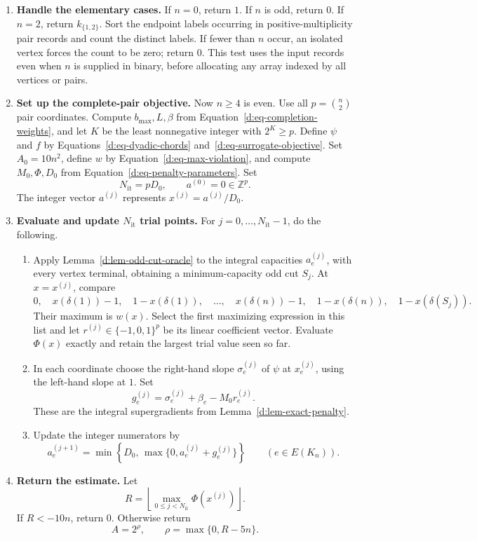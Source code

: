\begin{enumerate}[label=\textbf{\arabic*.},leftmargin=*]
\item \textbf{Handle the elementary cases.}
If \(n=0\), return \(1\).  If \(n\) is odd, return \(0\).
If \(n=2\), return \(k_{\{1,2\}}\).
Sort the endpoint labels occurring in positive-multiplicity pair records
and count the distinct labels. If fewer than \(n\) occur, an isolated
vertex forces the count to be zero; return \(0\).
This test uses the input records even when \(n\) is supplied in binary,
before allocating any array indexed by all vertices or pairs.

\item \textbf{Set up the complete-pair objective.}
Now \(n\ge4\) is even.  Use all \(p=\binom n2\) pair coordinates.
Compute \(b_{\max},L,\beta\) from Equation~\eqref{d:eq-completion-weights},
and let \(K\) be the least nonnegative integer with \(2^K\ge p\).
Define \(\psi\) and \(f\) by Equations~\eqref{d:eq-dyadic-chords}
and~\eqref{d:eq-surrogate-objective}.
Set \(A_0=10n^2\), define \(w\) by Equation~\eqref{d:eq-max-violation},
and compute \(M_0,\Phi,D_0\) from Equation~\eqref{d:eq-penalty-parameters}.
Set
\[
                 N_{\mathrm{it}}=pD_0,\qquad a^{(0)}=0\in\mathbb Z^p.
\]
The integer vector \(a^{(j)}\) represents \(x^{(j)}=a^{(j)}/D_0\).

\item \textbf{Evaluate and update \(N_{\mathrm{it}}\) trial points.}
For \(j=0,\ldots,N_{\mathrm{it}}-1\), do the following.
\begin{enumerate}[label=(\alph*),leftmargin=*]
\item Apply Lemma~\ref{d:lem-odd-cut-oracle} to the integral capacities
\(a^{(j)}_e\), with every vertex terminal, obtaining a minimum-capacity
odd cut \(S_j\).  At \(x=x^{(j)}\), compare
\[
 0,\quad x(\delta(1))-1,\quad 1-x(\delta(1)),\quad\ldots,\quad
 x(\delta(n))-1,\quad 1-x(\delta(n)),\quad 1-x(\delta(S_j)).
\]
Their maximum is \(w(x)\).  Select the first maximizing expression in
this list and let \(r^{(j)}\in\{-1,0,1\}^p\) be its linear coefficient
vector.  Evaluate \(\Phi(x)\) exactly and retain the largest trial value
seen so far.
\item In each coordinate choose the right-hand slope \(\sigma_e^{(j)}\)
of \(\psi\) at \(x_e^{(j)}\), using the left-hand slope at \(1\).
Set
\[
             g_e^{(j)}
                =\sigma_e^{(j)}+\beta_e-M_0r_e^{(j)}.
\]
These are the integral supergradients from
Lemma~\ref{d:lem-exact-penalty}.
\item Update the integer numerators by
\[
 a_e^{(j+1)}
       =\min\!\left\{D_0,\,
             \max\{0,a_e^{(j)}+g_e^{(j)}\}\right\}
       \qquad(e\in E(K_n)).
\]
\end{enumerate}

\item \textbf{Return the estimate.}
Let
\[
           R=\left\lfloor
                  \max_{0\le j<N_{\mathrm{it}}}\Phi(x^{(j)})
              \right\rfloor.
\]
If \(R<-10n\), return \(0\).  Otherwise return
\[
                      A=2^{\rho},
             \qquad \rho=\max\{0,R-5n\}.
\]
\end{enumerate}

